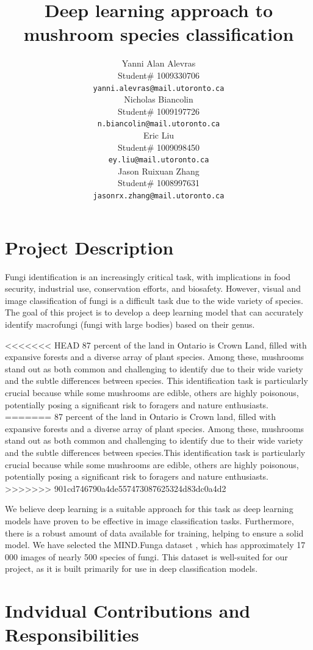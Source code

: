 \documentclass{article} %
\title{Deep learning approach to  \\ 
mushroom species classification}
\author{Yanni Alan Alevras  \\
Student\# 1009330706 \\
\texttt{yanni.alevras@mail.utoronto.ca} \\
\And
Nicholas Biancolin  \\
Student\# 1009197726 \\
\texttt{n.biancolin@mail.utoronto.ca} \\
\AND
Eric Liu  \\
Student\# 1009098450 \\
\texttt{ey.liu@mail.utoronto.ca} \\
\And
Jason Ruixuan Zhang \\
Student\# 1008997631 \\
\texttt{jasonrx.zhang@mail.utoronto.ca} \\
\AND
}
\begin{document}
\maketitle

\section{Project Description}
\label{sec:project_description}

Fungi identification is an increasingly critical task, with implications in food security, industrial use, conservation efforts, and biosafety. However, visual and image classification of fungi is a difficult task due to the wide variety of species. The goal of this project is to develop a deep learning model that can accurately identify macrofungi (fungi with large bodies) based on their genus. 

<<<<<<< HEAD
87 percent of the land in Ontario is Crown Land, filled with expansive forests and a diverse array of plant species. Among these, mushrooms stand out as both common and challenging to identify due to their wide variety and the subtle differences between species. This identification task is particularly crucial because while some mushrooms are edible, others are highly poisonous, potentially posing a significant risk to foragers and nature enthusiasts.
=======
87 percent of the land in Ontario is Crown land, filled with expansive forests and a diverse array of plant species. Among these, mushrooms stand out as both common and challenging to identify due to their wide variety and the subtle differences between species.This identification task is particularly crucial because while some mushrooms are edible, others are highly poisonous, potentially posing a significant risk to foragers and nature enthusiasts.
>>>>>>> 901cd746790a4de557473087625324d83dc0a4d2

We believe deep learning is a suitable approach for this task as deep learning models have proven to be effective in image classification tasks. Furthermore, there is a robust amount of data available for training, helping to ensure a solid model. We have selected the MIND.Funga dataset \citep{Drechsler-SantosKarstedtEtAl.MINDFunga.2023}, which has approximately 17 000 images of nearly 500 species of fungi. This dataset is well-suited for our project, as it is built primarily for use in deep classification models.


\section{Indvidual Contributions and Responsibilities}
\label{sec:individual_contributions_and_responsibilities}
\end{document}
